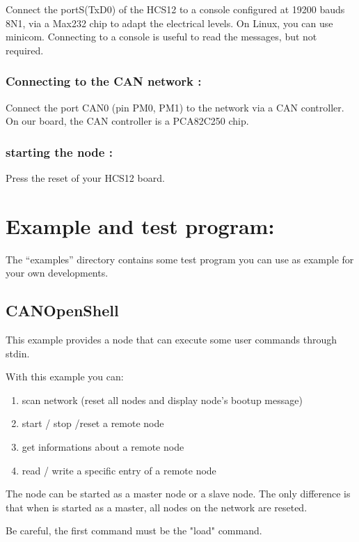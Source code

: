 \documentclass[12pt,english,a4paper]{book}
\begin{document}
Connect the portS(TxD0) of the HCS12 to a console configured at 19200
bauds 8N1, via a Max232 chip to adapt the electrical levels. On Linux,
you can use minicom. Connecting to a console is useful to read the
messages, but not required.


\subsubsection{Connecting to the CAN network :}

Connect the port CAN0 (pin PM0, PM1) to the network via a CAN controller.
On our board, the CAN controller is a PCA82C250 chip.


\subsubsection{starting the node :}

Press the reset of your HCS12 board.


\section{Example and test program:}

The {}``examples'' directory contains some test program you can
use as example for your own developments.

\subsection{CANOpenShell}

This example provides a node that can execute some user commands through stdin. 

With this example you can:
\begin{enumerate}
\item scan network (reset all nodes and display node's bootup message)
\item start / stop /reset a remote node
\item get informations about a remote node
\item read / write a specific entry of a remote node
\end{enumerate}

The node can be started as a master node or a slave node. The only difference is 
that when is started as a master, all nodes on the network are reseted.

Be careful, the first command must be the "load" command.
\end{document}
